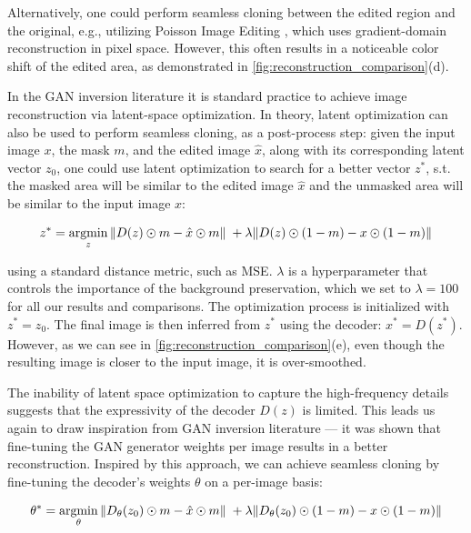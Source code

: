 Alternatively, one could perform seamless cloning between the edited region and the original, e.g., utilizing Poisson Image Editing \cite{perez2003poisson}, which uses gradient-domain reconstruction in pixel space. However, this often results in a noticeable color shift of the edited area, as demonstrated in \ref{fig:reconstruction_comparison}(d).

In the GAN inversion literature \cite{abdal2019image2stylegan, abdal2020image2stylegan++,zhu2020domain,xia2021gan} it is standard practice to achieve image reconstruction via latent-space optimization. In theory, latent optimization can also be used to perform seamless cloning, as a post-process step: given the input image $x$, the mask $m$, and the edited image $\hat{x}$, along with its corresponding latent vector $z_0$, one could use latent optimization to search for a better vector $z^*$, s.t. the masked area will be similar to the edited image $\hat{x}$ and the unmasked area will be similar to the input image $x$:

\begin{equation}
    \label{eqn:latent_optimization}
    z^* = \operatornamewithlimits{argmin}\limits_{z} \| D(z) \odot m - \hat{x} \odot m \| \;+ \\ \lambda \| D(z) \odot (1 - m) - x \odot (1 - m) \|  
\end{equation}

using a standard distance metric, such as MSE. $\lambda$ is a hyperparameter that controls the importance of the background preservation, which we set to $\lambda = 100$ for all our results and comparisons. The optimization process is initialized with $z^* = z_0$. The final image is then inferred from $z^*$ using the decoder: $x^*=D(z^*).$ However, as we can see in \ref{fig:reconstruction_comparison}(e), even though the resulting image is closer to the input image, it is over-smoothed.

The inability of latent space optimization to capture the high-frequency details suggests that the expressivity of the decoder $D(z)$ is limited. This leads us again to draw inspiration from GAN inversion literature --- it was shown \cite{bau2020semantic, pan2021exploiting,roich2021pivotal, tzaban2022stitch} that fine-tuning the GAN generator weights per image results in a better reconstruction. Inspired by this approach, we can achieve seamless cloning by fine-tuning the decoder's weights $\theta$ on a per-image basis:

\begin{equation}
    \label{eqn:weights_optimization}
    \theta^* = \operatornamewithlimits{argmin}\limits_{\theta} \| D_{\theta}(z_0) \odot m - \hat{x} \odot m \| \;+ \\ \lambda \| D_{\theta}(z_0) \odot (1 - m) - x \odot (1 - m) \|
\end{equation}

